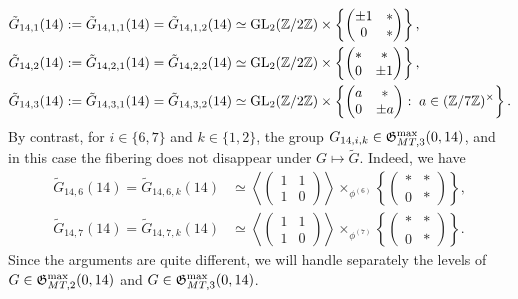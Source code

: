 \begin{equation} \label{tildeGlevel14groupsincase2}
\begin{split}
\tilde{G}_{14,1}(14) := \tilde{G}_{14,1,1}(14) = \tilde{G}_{14,1,2}(14) &\simeq \operatorname{GL}_2(\mathbb{Z}/2\mathbb{Z}) \times \left\{ \begin{pmatrix} \pm 1 & * \\ 0 & * \end{pmatrix} \right\}, \\
\tilde{G}_{14,2}(14) := \tilde{G}_{14,2,1}(14) = \tilde{G}_{14,2,2}(14) &\simeq \operatorname{GL}_2(\mathbb{Z}/2\mathbb{Z}) \times \left\{ \begin{pmatrix} * & * \\ 0 & \pm 1 \end{pmatrix} \right\}, \\
\tilde{G}_{14,3}(14) := \tilde{G}_{14,3,1}(14) = \tilde{G}_{14,3,2}(14) &\simeq \operatorname{GL}_2(\mathbb{Z}/2\mathbb{Z}) \times \left\{ \begin{pmatrix} a & * \\ 0 & \pm a \end{pmatrix} : \; a \in (\mathbb{Z}/7\mathbb{Z})^\times \right\}.
\end{split}
\end{equation}
By contrast, for $i \in \{6, 7\}$ and $k \in \{1, 2 \}$, the group $G_{14,i,k} \in \mathfrak{G}_{MT,3}^{\max}(0,14)$, and in this case the fibering does not disappear under $G \mapsto \tilde{G}$. Indeed, we have
\begin{equation} \label{tildeGlevel14groupsincase3}
\begin{split}
\tilde{G}_{14,6}(14) = \tilde{G}_{14,6,k}(14) &\simeq \left\langle \begin{pmatrix} 1 & 1 \\ 1 & 0 \end{pmatrix} \right\rangle \times_{\phi^{(6)}} \left\{ \begin{pmatrix} * & * \\ 0 & * \end{pmatrix} \right\}, \\
\tilde{G}_{14,7}(14) = \tilde{G}_{14,7,k}(14) &\simeq \left\langle \begin{pmatrix} 1 & 1 \\ 1 & 0 \end{pmatrix} \right\rangle \times_{\phi^{(7)}} \left\{ \begin{pmatrix} * & * \\ 0 & * \end{pmatrix} \right\}.
\end{split}
\end{equation}
Since the arguments are quite different, we will handle separately the levels of $G \in \mathfrak{G}_{MT,2}^{\max}(0,14)$ and $G \in \mathfrak{G}_{MT,3}^{\max}(0,14)$.

